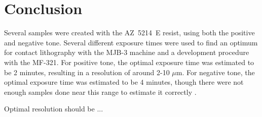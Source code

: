 \section*{Conclusion}
Several samples were created with the AZ~5214~E resist, using both the positive and negative tone. Several different exposure times were used to find an optimum for contact lithography with the MJB-3 machine and a development procedure with the MF-321. For positive tone, the optimal exposure time was estimated to be 2 minutes, resulting in a resolution of around 2-10 $\mu$m. For negative tone, the optimal exposure time was estimated to be 4 minutes, though there were not enough samples done near this range to estimate it correctly .

Optimal resolution should be ...